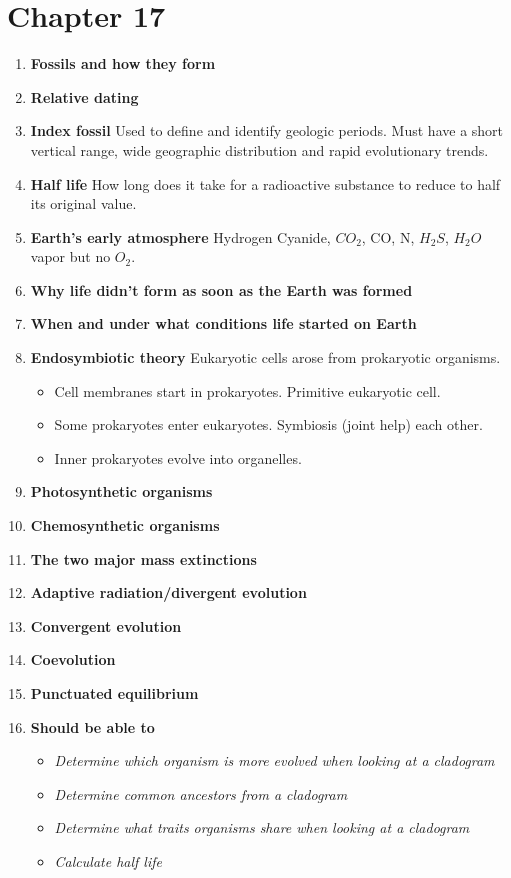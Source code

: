 \documentclass[9pt]{article}
\begin{document}
\section*{Chapter 17}
\begin{enumerate}
  \item {\bf Fossils and how they form}
  \item {\bf Relative dating}
  \item {\bf Index fossil} Used to define and identify geologic
    periods. Must have a short vertical range, wide geographic
    distribution and rapid evolutionary trends.
  \item  {\bf Half  life}  How long  does it  take  for a  radioactive
    substance to reduce to half its original value.
  \item {\bf Earth's early atmosphere} Hydrogen Cyanide, $CO_2$, CO, N,
    $H_2S$, $H_2O$ vapor but no $O_2$.
  \item {\bf Why life didn't form as soon as the Earth was formed}
  \item {\bf When and under what conditions life started on Earth}
  \item {\bf Endosymbiotic theory} Eukaryotic cells arose from
    prokaryotic organisms.
    \begin{itemize}
    \item Cell membranes start in prokaryotes. Primitive eukaryotic cell.
    \item Some prokaryotes enter eukaryotes. Symbiosis (joint help) each other.
    \item Inner prokaryotes evolve into organelles.
    \end{itemize}
  \item {\bf Photosynthetic organisms}
  \item {\bf Chemosynthetic organisms}
  \item {\bf The two major mass extinctions}
  \item {\bf Adaptive radiation/divergent evolution}
  \item {\bf Convergent evolution}
  \item {\bf Coevolution}
  \item {\bf Punctuated equilibrium}
  \item {\bf Should be able to}
    \begin{itemize}
      \item {\em Determine which organism is more evolved when looking at a cladogram}
      \item {\em Determine common ancestors from a cladogram}
      \item {\em Determine what traits organisms share when looking at a cladogram}
      \item {\em Calculate half life}
    \end{itemize}
\end{enumerate}
\end{document}
